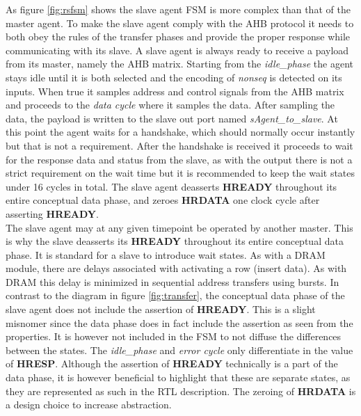 As figure \ref{fig:rsfsm} shows the slave agent FSM is more complex than that of the master agent. To make the slave agent comply with the AHB protocol it needs to both obey the rules of the transfer phases and provide the proper response while communicating with its slave. A slave agent is always ready to receive a payload from its master, namely the AHB matrix. Starting from the \textit{idle\_phase} the agent stays idle until it is both selected and the encoding of \textit{nonseq} is detected on its inputs. When true it samples address and control signals from the AHB matrix and proceeds to the \textit{data cycle} where it samples the data. After sampling the data, the payload is written to the slave out port named \textit{sAgent\_to\_slave}. At this point the agent waits for a handshake, which should normally occur instantly but that is not a requirement. After the handshake is received it proceeds to wait for the response data and status from the slave, as with the output there is not a strict requirement on the wait time but it is recommended to keep the wait states under 16 cycles in total. The slave agent deasserts \textbf{HREADY} throughout its entire conceptual data phase, and zeroes \textbf{HRDATA} one clock cycle after asserting \textbf{HREADY}. \\
\newline
The slave agent may at any given timepoint be operated by another master. This is why the slave deasserts its \textbf{HREADY} throughout its entire conceptual data phase. It is standard for a slave to introduce wait states. As with a DRAM module, there are delays associated with activating a row (insert data). As with DRAM this delay is minimized in sequential address transfers using bursts. In contrast to the diagram in figure \ref{fig:transfer}, the conceptual data phase of the slave agent does not include the assertion of \textbf{HREADY}. This is a slight misnomer since the data phase does in fact include the assertion as seen from the properties. It is however not included in the FSM to not diffuse the differences between the states. The \textit{idle\_phase} and \textit{error cycle} only differentiate in the value of \textbf{HRESP}. Although the assertion of \textbf{HREADY} technically is a part of the data phase, it is however beneficial to highlight that these are separate states, as they are represented as such in the RTL description. The zeroing of \textbf{HRDATA} is a design choice to increase abstraction. 
\newpage

